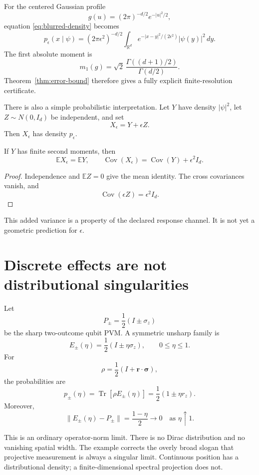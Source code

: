 \documentclass[11pt]{article}
\newcommand{\Tr}{\operatorname{Tr}}
\begin{document}
For the centered Gaussian profile
\[
g(u)=(2\pi)^{-d/2}e^{-|u|^2/2},
\]
equation \eqref{eq:blurred-density} becomes
\[
p_\epsilon(x\mid\psi)
=(2\pi\epsilon^2)^{-d/2}
\int_{\mathbb R^d}
e^{-|x-y|^2/(2\epsilon^2)}
|\psi(y)|^2\,dy.
\]
The first absolute moment is
\[
m_1(g)
=
\sqrt{2}\,
\frac{\Gamma((d+1)/2)}{\Gamma(d/2)}.
\]
Theorem~\ref{thm:error-bound} therefore gives a fully explicit
finite-resolution certificate.

There is also a simple probabilistic interpretation. Let \(Y\) have density
\(|\psi|^2\), let \(Z\sim N(0,I_d)\) be independent, and set
\[
X_\epsilon=Y+\epsilon Z.
\]
Then \(X_\epsilon\) has density \(p_\epsilon\).

\begin{proposition}
\label{prop:gaussian-covariance}
If \(Y\) has finite second moments, then
\[
\mathbb E X_\epsilon=\mathbb E Y,
\qquad
\operatorname{Cov}(X_\epsilon)
=\operatorname{Cov}(Y)+\epsilon^2I_d.
\]
\end{proposition}

\begin{proof}
Independence and \(\mathbb EZ=0\) give the mean identity. The cross
covariances vanish, and
\[
\operatorname{Cov}(\epsilon Z)=\epsilon^2I_d.
\]
\end{proof}

This added variance is a property of the declared response channel. It is not
yet a geometric prediction for \(\epsilon\).

\section{Discrete effects are not distributional singularities}

Let
\[
P_\pm=\frac12(I\pm\sigma_z)
\]
be the sharp two-outcome qubit PVM. A symmetric unsharp family is
\[
E_\pm(\eta)
=\frac12(I\pm\eta\sigma_z),
\qquad 0\leq\eta\leq1.
\]
For
\[
\rho=\frac12(I+\mathbf r\cdot\boldsymbol\sigma),
\]
the probabilities are
\[
p_\pm(\eta)
=\Tr[\rho E_\pm(\eta)]
=\frac12(1\pm\eta r_z).
\]
Moreover,
\[
\|E_\pm(\eta)-P_\pm\|
=\frac{1-\eta}{2}
\longrightarrow0
\quad\text{as }\eta\uparrow1.
\]

This is an ordinary operator-norm limit. There is no Dirac distribution and
no vanishing spatial width. The example corrects the overly broad slogan
that projective measurement is always a singular limit. Continuous position
has a distributional density; a finite-dimensional spectral projection does
not.
\end{document}
